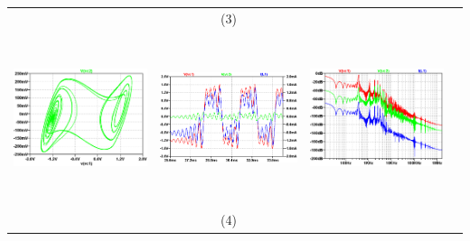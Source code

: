 \documentclass{rbf}
\begin{document}
\begin{table}[h]
\begin{tabular}{c c c c}
        & (3) &  \\
        \includegraphics[width=5cm,height=5cm]{r0/ro30.png}&
        \includegraphics[width=5cm,height=5cm]{r0/ro30TS.png}&
        \includegraphics[width=5cm,height=5cm]{r0/ro30FFT.png}&\\
        & (4) &  \\
        \hline
    \end{tabular}
\end{table}
\end{document}
